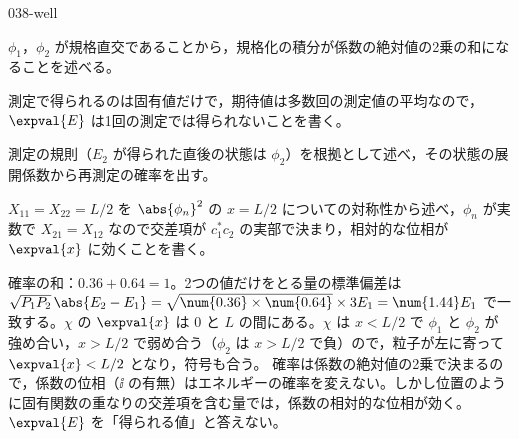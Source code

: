 \documentclass[uplatex,dvipdfmx,a4paper,11pt]{jsarticle}
\begin{document}
\begin{kaisetsu}{038-well}
\begin{ronten}
  \item {} $\phi_{1}$，$\phi_{2}$ が規格直交であることから，規格化の積分が係数の絶対値の2乗の和になることを述べる。
  \item {} 測定で得られるのは固有値だけで，期待値は多数回の測定値の平均なので，$\expval{E}$ は1回の測定では得られないことを書く。
  \item {} 測定の規則（$E_{2}$ が得られた直後の状態は $\phi_{2}$）を根拠として述べ，その状態の展開係数から再測定の確率を出す。
  \item {} $X_{11}=X_{22}=L/2$ を $\abs{\phi_{n}}^{2}$ の $x=L/2$ についての対称性から述べ，$\phi_{n}$ が実数で $X_{21}=X_{12}$ なので交差項が $c_{1}^{*}c_{2}$ の実部で決まり，相対的な位相が $\expval{x}$ に効くことを書く。
\end{ronten}
\kenzan 確率の和：$\num{0.36}+\num{0.64}=1$。2つの値だけをとる量の標準偏差は $\sqrt{P_{1}P_{2}}\,\abs{E_{2}-E_{1}}=\sqrt{\num{0.36}\times\num{0.64}}\times 3E_{1}=\num{1.44}E_{1}$ で一致する。$\chi$ の $\expval{x}$ は $0$ と $L$ の間にある。$\chi$ は $x<L/2$ で $\phi_{1}$ と $\phi_{2}$ が強め合い，$x>L/2$ で弱め合う（$\phi_{2}$ は $x>L/2$ で負）ので，粒子が左に寄って $\expval{x}<L/2$ となり，符号も合う。
\tsumazuki 確率は係数の絶対値の2乗で決まるので，係数の位相（$\ii$ の有無）はエネルギーの確率を変えない。しかし位置のように固有関数の重なりの交差項を含む量では，係数の相対的な位相が効く。$\expval{E}$ を「得られる値」と答えない。
\end{kaisetsu}
\end{document}

